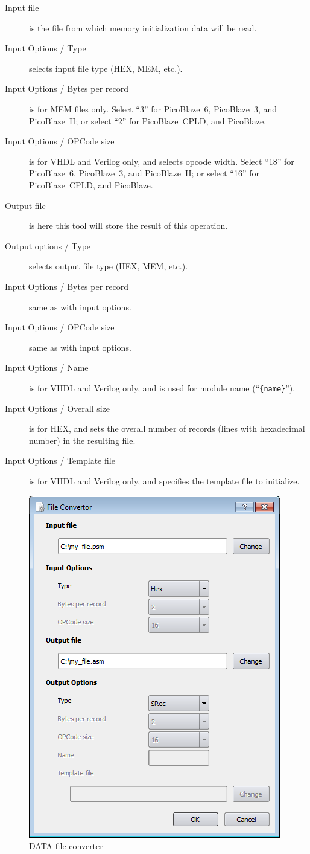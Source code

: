         \begin{description}
            \item[Input file] is the file from which memory initialization data will be read.
            \item[Input Options / Type] selects input file type (HEX, MEM, etc.).
            \item[Input Options / Bytes per record] is for MEM files only. Select ``3'' for PicoBlaze~6, PicoBlaze~3, and PicoBlaze~II; or select ``2'' for PicoBlaze~CPLD, and PicoBlaze.
            \item[Input Options / OPCode size] is for VHDL and Verilog only, and selects opcode width. Select ``18'' for PicoBlaze~6, PicoBlaze~3, and PicoBlaze~II; or select ``16'' for PicoBlaze~CPLD, and PicoBlaze.
            \item[Output file] is here this tool will store the result of this operation.
            \item[Output options / Type]  selects output file type (HEX, MEM, etc.).
            \item[Input Options / Bytes per record] same as with input options.
            \item[Input Options / OPCode size] same as with input options.
            \item[Input Options / Name] is for VHDL and Verilog only, and is used for module name (``\verb'{name}''').
            \item[Input Options / Overall size] is for HEX, and sets the overall number of records (lines with hexadecimal number) in the resulting file.
            \item[Input Options / Template file]  is for VHDL and Verilog only, and specifies the template file to initialize.
        \end{description}

        \enlargethispage{6\baselineskip}
        \begin{figure}[h]
            \centering
            \includegraphics[width=.5\textwidth]{img/DATA_converter.png}
            \caption{DATA file converter}
        \end{figure}

